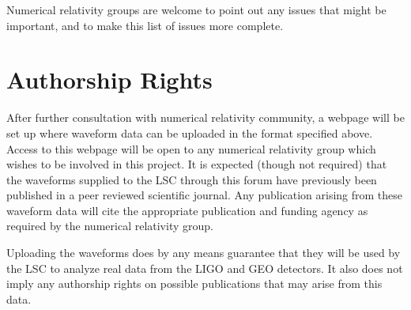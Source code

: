 \documentclass{article}
\numberwithin{equation}{section}
\begin{document}
Numerical relativity groups are welcome to point out any issues that
might be important, and to make this list of issues more complete.  


\section{Authorship Rights}
\label{sec:authorship}

After further consultation with numerical relativity community, a
webpage will be set up where waveform data can be uploaded in the
format specified above.  Access to this webpage will be open to any
numerical relativity group which wishes to be involved in this
project.  It is expected (though not required) that the waveforms
supplied to the LSC through this forum have previously been published
in a peer reviewed scientific journal.  Any publication arising from
these waveform data will cite the appropriate publication and funding
agency as required by the numerical relativity group.

Uploading the waveforms does by any means guarantee that they will be
used by the LSC to analyze real data from the LIGO and GEO detectors.
It also does not imply any authorship rights on possible publications
that may arise from this data.
\end{document}
